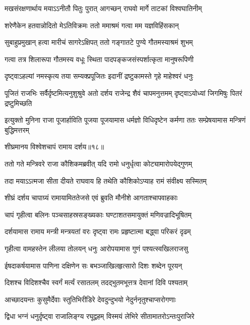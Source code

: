 \twolineshloka
{मखसंरक्षणार्थाय मयाऽऽनीतौ पितुः पुरात्}
{आगच्छन् राघवो मार्गे ताटकां विश्वघातिनीम्} %

\twolineshloka
{शरेणैकेन हतवान्नोदितो मेऽतिविक्रमः}
{ततो ममाश्रमं गत्वा मम यज्ञविहिंसकान्} %

\twolineshloka
{सुबाहुप्रमुखान् हत्वा मारीचं सागरेऽक्षिपत्}
{ततो गङ्गातटे पुण्ये गौतमस्याश्रमं शुभम्} %

\twolineshloka
{गत्वा तत्र शिलारूपा गौतमस्य वधूः स्थिता}
{पादपङ्कजसंस्पर्शात्कृता मानुषरूपिणी} %

\twolineshloka
{दृष्ट्वाऽहल्यां नमस्कृत्य तया सम्यक्प्रपूजितः}
{इदानीं द्रष्टुकामस्ते गृहे माहेश्वरं धनुः} %

\threelineshloka
{पूजितं राजभिः सर्वैर्दृष्टमित्यनुशुश्रुवे}
{अतो दर्शय राजेन्द्र शैवं चापमनुत्तमम्}
{दृष्ट्वाऽयोध्यां जिगमिषुः पितरं द्रष्टुमिच्छति} %

\threelineshloka
{इत्युक्तो मुनिना राजा पूजार्हाविति पूजया}
{पूजयामास धर्मज्ञो विधिदृष्टेन कर्मणा}
{ततः सम्प्रेषयामास मन्त्रिणं बुद्धिमत्तरम्} %


{शीघ्रमानय विश्वेशचापं रामाय दर्शय॥१८॥} %


\twolineshloka
{ततो गते मन्त्रिवरे राजा कौशिकमब्रवीत्}
{यदि रामो धनुर्धृत्वा कोट्यामारोपयेद्गुणम्} %

\twolineshloka
{तदा मयाऽऽत्मजा सीता दीयते राघवाय हि}
{तथेति कौशिकोऽप्याह रामं संवीक्ष्य सस्मितम्} %

\twolineshloka
{शीघ्रं दर्शय चापाग्र्यं रामायामिततेजसे}
{एवं ब्रुवति मौनीशे आगताश्चापवाहकाः} %

\twolineshloka
{चापं गृहीत्वा बलिनः पञ्चसाहस्रसङ्ख्यकाः}
{घण्टाशतसमायुक्तं मणिवज्रादिभूषितम्} %

\twolineshloka
{दर्शयामास रामाय मन्त्री मन्त्रयतां वरः}
{दृष्ट्वा रामः प्रहृष्टात्मा बद्ध्वा परिकरं दृढम्} %

\twolineshloka
{गृहीत्वा वामहस्तेन लीलया तोलयन् धनुः}
{आरोपयामास गुणं पश्यत्स्वखिलराजसु} %

\twolineshloka
{ईषदाकर्षयामास पाणिना दक्षिणेन सः}
{बभञ्जाखिलहृत्सारो दिशः शब्देन पूरयन्} %

\twolineshloka
{दिशश्च विदिशश्चैव स्वर्गं मर्त्यं रसातलम्}
{तदद्भुतमभूत्तत्र देवानां दिवि पश्यताम्} %

\twolineshloka
{आच्छादयन्तः कुसुमैर्देवाः स्तुतिभिरीडिरे}
{देवदुन्दुभयो नेदुर्ननृतुश्चाप्सरोगणाः} %

\twolineshloka
{द्विधा भग्नं धनुर्दृष्ट्वा राजालिङ्ग्य रघूद्वहम्}
{विस्मयं लेभिरे सीतामातरोऽन्तःपुराजिरे} %

